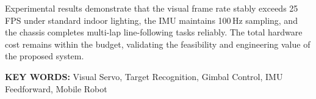 Experimental results demonstrate that the visual frame rate stably exceeds 25\,FPS under standard indoor lighting, the IMU maintains 100\,Hz sampling, and the chassis completes multi-lap line-following tasks reliably. The total hardware cost remains within the budget, validating the feasibility and engineering value of the proposed system.

\textbf{KEY WORDS:} Visual Servo, Target Recognition, Gimbal Control, IMU Feedforward, Mobile Robot

\newpage\quad
\clearpage
